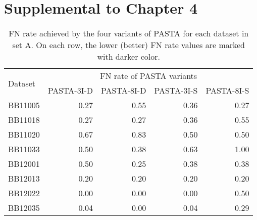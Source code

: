 \section{Supplemental to Chapter 4}
\label{sec:result_balibase}

\begin{table}[!htbp]
	\centering
	\small
	\caption{FN rate achieved by the four variants of PASTA for each dataset in set A. On each row, the lower (better) FN rate values are marked with darker color.}
	\begin{tabular}{|l|r|r|r|r|}
		\hline
		\multirow{2}{*}{Dataset} & \multicolumn{4}{c|}{FN rate of PASTA variants } \\
		\cline{2-5}          & \multicolumn{1}{l|}{PASTA-3I-D} & \multicolumn{1}{l|}{PASTA-8I-D} & \multicolumn{1}{l|}{PASTA-3I-S} & \multicolumn{1}{l|}{PASTA-8I-S} \\
		\hline
		BB11005 & \cellcolor[rgb]{ .384,  .745,  .478}0.27 & \cellcolor[rgb]{ .988,  1,  .992}0.55 & \cellcolor[rgb]{ .584,  .827,  .647}0.36 & \cellcolor[rgb]{ .384,  .745,  .478}0.27 \\
		\hline
		BB11018 & \cellcolor[rgb]{ .384,  .745,  .478}0.27 & \cellcolor[rgb]{ .384,  .745,  .478}0.27 & \cellcolor[rgb]{ .584,  .827,  .647}0.36 & \cellcolor[rgb]{ .988,  1,  .992}0.55 \\
		\hline
		BB11020 & \cellcolor[rgb]{ .686,  .871,  .733}0.67 & \cellcolor[rgb]{ .988,  1,  .992}0.83 & \cellcolor[rgb]{ .384,  .745,  .478}0.50 & \cellcolor[rgb]{ .384,  .745,  .478}0.50 \\
		\hline
		BB11033 & \cellcolor[rgb]{ .502,  .796,  .58}0.50 & \cellcolor[rgb]{ .384,  .745,  .478}0.38 & \cellcolor[rgb]{ .624,  .847,  .682}0.63 & \cellcolor[rgb]{ .988,  1,  .992}1.00 \\
		\hline
		BB12001 & \cellcolor[rgb]{ .988,  1,  .992}0.50 & \cellcolor[rgb]{ .384,  .745,  .478}0.25 & \cellcolor[rgb]{ .686,  .871,  .733}0.38 & \cellcolor[rgb]{ .686,  .871,  .733}0.38 \\
		\hline
		BB12013 & \cellcolor[rgb]{ .988,  1,  .992}0.20 & \cellcolor[rgb]{ .988,  1,  .992}0.20 & \cellcolor[rgb]{ .988,  1,  .992}0.20 & \cellcolor[rgb]{ .988,  1,  .992}0.20 \\
		\hline
		BB12022 & \cellcolor[rgb]{ .384,  .745,  .478}0.00 & \cellcolor[rgb]{ .384,  .745,  .478}0.00 & \cellcolor[rgb]{ .384,  .745,  .478}0.00 & \cellcolor[rgb]{ .988,  1,  .992}0.50 \\
		\hline
		BB12035 & \cellcolor[rgb]{ .467,  .78,  .549}0.04 & \cellcolor[rgb]{ .384,  .745,  .478}0.00 & \cellcolor[rgb]{ .467,  .78,  .549}0.04 & \cellcolor[rgb]{ .988,  1,  .992}0.29 \\

\end{tabular}
\end{table}
